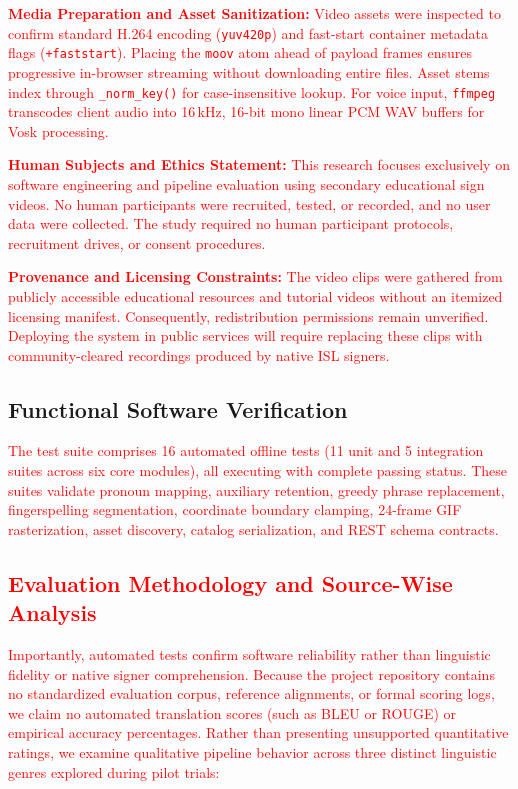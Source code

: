 \documentclass[conference,a4paper,10pt]{IEEEtran}
\begin{document}
\textcolor{red}{\textbf{Media Preparation and Asset Sanitization:} Video assets were inspected to confirm standard H.264 encoding (\texttt{yuv420p}) and fast-start container metadata flags (\texttt{+faststart}). Placing the \texttt{moov} atom ahead of payload frames ensures progressive in-browser streaming without downloading entire files. Asset stems index through \texttt{\_norm\_key()} for case-insensitive lookup. For voice input, \texttt{ffmpeg} transcodes client audio into 16\,kHz, 16-bit mono linear PCM WAV buffers for Vosk processing.}

\textcolor{red}{\textbf{Human Subjects and Ethics Statement:} This research focuses exclusively on software engineering and pipeline evaluation using secondary educational sign videos. No human participants were recruited, tested, or recorded, and no user data were collected. The study required no human participant protocols, recruitment drives, or consent procedures.}

\textcolor{red}{\textbf{Provenance and Licensing Constraints:} The video clips were gathered from publicly accessible educational resources and tutorial videos without an itemized licensing manifest. Consequently, redistribution permissions remain unverified. Deploying the system in public services will require replacing these clips with community-cleared recordings produced by native ISL signers.}

\subsection{Functional Software Verification}
\label{subsec:unit_tests}

\textcolor{red}{The test suite comprises 16 automated offline tests (11 unit and 5 integration suites across six core modules), all executing with complete passing status. These suites validate pronoun mapping, auxiliary retention, greedy phrase replacement, fingerspelling segmentation, coordinate boundary clamping, 24-frame GIF rasterization, asset discovery, catalog serialization, and REST schema contracts.}

\subsection{\textcolor{red}{Evaluation Methodology and Source-Wise Analysis}}
\label{subsec:eval_status}

\textcolor{red}{Importantly, automated tests confirm software reliability rather than linguistic fidelity or native signer comprehension. Because the project repository contains no standardized evaluation corpus, reference alignments, or formal scoring logs, we claim no automated translation scores (such as BLEU or ROUGE) or empirical accuracy percentages. Rather than presenting unsupported quantitative ratings, we examine qualitative pipeline behavior across three distinct linguistic genres explored during pilot trials:}
\end{document}
